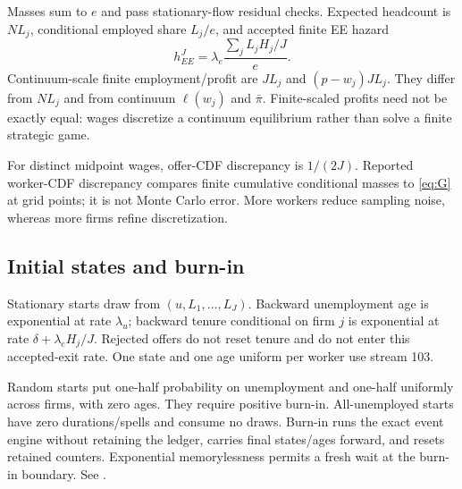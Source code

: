 \documentclass[11pt,letterpaper]{article}
\newcommand{\code}[1]{\texttt{\detokenize{#1}}}
\begin{document}
Masses sum to $e$ and pass stationary-flow residual checks. Expected
headcount is $NL_j$, conditional employed share $L_j/e$, and accepted
finite EE hazard
\[
h_{EE}^J=\lambda_e\frac{\sum_jL_jH_j/J}{e}.
\]
Continuum-scale finite employment/profit are $JL_j$ and $(p-w_j)JL_j$.
They differ from $NL_j$ and from continuum $\ell(w_j)$ and $\bar\pi$.
Finite-scaled profits need not be exactly equal: wages discretize a
continuum equilibrium rather than solve a finite strategic game.

For distinct midpoint wages, offer-CDF discrepancy is $1/(2J)$.
Reported worker-CDF discrepancy compares finite cumulative conditional
masses to \eqref{eq:G} at grid points; it is not Monte Carlo error.
More workers reduce sampling noise, whereas more firms refine discretization.

\subsection{Initial states and burn-in}
Stationary starts draw from $(u,L_1,\ldots,L_J)$. Backward unemployment
age is exponential at rate $\lambda_u$; backward tenure conditional on
firm $j$ is exponential at rate $\delta+\lambda_e H_j/J$.
Rejected offers do not reset tenure and do not enter this accepted-exit
rate. One state and one age uniform per worker use stream 103.

Random starts put one-half probability on unemployment and one-half
uniformly across firms, with zero ages. They require positive burn-in.
All-unemployed starts have zero durations/spells and consume no draws.
Burn-in runs the exact event engine without retaining the ledger, carries
final states/ages forward, and resets retained counters.
Exponential memorylessness permits a fresh wait at the burn-in boundary.
See \code{src/fesim_bm_initial.mata}.
\end{document}
